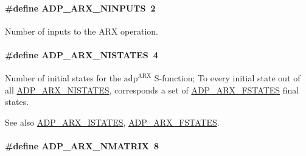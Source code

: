 \hypertarget{adp-arx_8hh_a41f017d072231a64ea971421941d6d75}{
\paragraph[{\-A\-D\-P\-\_\-\-A\-R\-X\-\_\-\-N\-I\-N\-P\-U\-T\-S}]{\setlength{\rightskip}{0pt plus 5cm}\#define {\bf \-A\-D\-P\-\_\-\-A\-R\-X\-\_\-\-N\-I\-N\-P\-U\-T\-S}~2}}\label{adp-arx_8hh_a41f017d072231a64ea971421941d6d75}
\-Number of inputs to the \-A\-R\-X operation. \hypertarget{adp-arx_8hh_af9236f8d08a54b97ed2199271de979f6}{
\paragraph[{\-A\-D\-P\-\_\-\-A\-R\-X\-\_\-\-N\-I\-S\-T\-A\-T\-E\-S}]{\setlength{\rightskip}{0pt plus 5cm}\#define {\bf \-A\-D\-P\-\_\-\-A\-R\-X\-\_\-\-N\-I\-S\-T\-A\-T\-E\-S}~4}}\label{adp-arx_8hh_af9236f8d08a54b97ed2199271de979f6}
\-Number of initial states for the $\mathrm{adp}^{\mathrm{ARX}}$ \-S-\/function; \-To every initial state out of all \hyperlink{adp-arx_8hh_af9236f8d08a54b97ed2199271de979f6}{\-A\-D\-P\-\_\-\-A\-R\-X\-\_\-\-N\-I\-S\-T\-A\-T\-E\-S}, corresponds a set of \hyperlink{adp-arx_8hh_af70040b1b46c82f1fbe37b5bab89d7db}{\-A\-D\-P\-\_\-\-A\-R\-X\-\_\-\-F\-S\-T\-A\-T\-E\-S} final states. \begin{DoxySeeAlso}{\-See also}
\hyperlink{adp-arx_8hh_a94f941841e2bc961bc9abd1c7e0b8513}{\-A\-D\-P\-\_\-\-A\-R\-X\-\_\-\-I\-S\-T\-A\-T\-E\-S}, \hyperlink{adp-arx_8hh_af70040b1b46c82f1fbe37b5bab89d7db}{\-A\-D\-P\-\_\-\-A\-R\-X\-\_\-\-F\-S\-T\-A\-T\-E\-S}. 
\end{DoxySeeAlso}
\hypertarget{adp-arx_8hh_af6f580b310ea3dec4a6610596a4ad658}{
\paragraph[{\-A\-D\-P\-\_\-\-A\-R\-X\-\_\-\-N\-M\-A\-T\-R\-I\-X}]{\setlength{\rightskip}{0pt plus 5cm}\#define {\bf \-A\-D\-P\-\_\-\-A\-R\-X\-\_\-\-N\-M\-A\-T\-R\-I\-X}~8}}\label{adp-arx_8hh_af6f580b310ea3dec4a6610596a4ad658}
